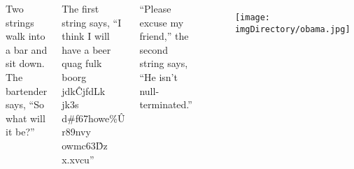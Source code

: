 \documentclass[compress]{beamer}
\renewenvironment{quotation}
	{\list{}{\leftmargin=3pt\rightmargin=3pt}\item\relax}{\endlist}
\begin{document}
\begin{slide}
	\begin{columns}
	\begin{quotation} \scriptsize \normalfont

Two strings walk into a bar and sit down.
The bartender says, ``So what will it be?''

The first string says, ``I think I will have a beer quag fulk boorg jdk\^CjfdLk jk3s d\#f67howe\%\^U r89nvy owmc63\^Dz x.xvcu''

``Please excuse my friend,'' the second string says, ``He isn't null-terminated.''

	\end{quotation}
	\begin{figure}
	\texttt{[image: \\imgDirectory/obama.jpg]}
	\end{figure}
	\end{columns}
\end{slide}
\end{document}
